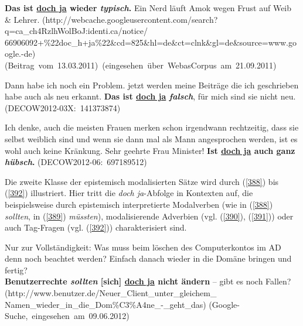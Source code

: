 \begin{exe}
	\ex\label{385}
	\scriptsize
	 \textbf{Das ist \underline{doch ja} wieder \textit{typisch}.} Ein \glqq Nerd\grqq{} läuft Amok wegen Frust auf Weib \&
 		Lehrer.
 	\newline
	\hbox{}\hfill\hbox{(http://webcache.googleusercontent.com/search?q=ca\_ch4Rz\\lhWolBoJ:identi.ca/notice/}
	\newline
	\hbox{}\hfill\hbox{66906092+\%22doc\_h+ja\%22\&cd=825\&hl=de\&ct=clnk\&gl=de\&source=www.google.-de)}
	\newline
	\hbox{}\hfill\hbox{(Beitrag vom 13.03.2011) (eingesehen über WebasCorpus am 21.09.2011)}						
	\newline
	\hbox{}\hfill\hbox{\citet[176]{Mueller2014a}}	 
\end{exe}

\begin{exe}
	\ex\label{386}
	\scriptsize
	Dann habe ich noch ein Problem. jetzt werden meine Beiträge die ich geschrieben habe auch als neu erkannt. \textbf{Das ist \underline{doch ja} 				\textit{falsch}}, für mich sind sie nicht neu. 
	\hfill\hbox{(DECOW2012-03X: 141373874)}	 
\end{exe}

\begin{exe}
	\ex\label{387}
	\scriptsize
	Ich denke, auch die meisten Frauen merken schon irgendwann rechtzeitig, dass sie selbst weiblich sind und wenn sie dann mal als Mann angesprochen 			werden, ist es wohl auch keine Kränkung. \glqq Sehr geehrte Frau Minister!\grqq{} \textbf{Ist \underline{doch ja} auch ganz \textit{hübsch}.} 
	\hfill\hbox{(DECOW2012-06: 697189512)}	 
	\newline
	\hbox{}\hfill\hbox{\citet[201]{Mueller2014a}}	
\end{exe}
Die zweite Klasse der epistemisch modalisierten Sätze wird durch (\ref{388}) bis (\ref{392}) illustriert. Hier tritt die \textit{doch ja}-Abfolge in Kontexten auf, die beispielsweise durch  epistemisch interpretierte Modalverben (wie in (\ref{388}) \textit{sollten}, in (\ref{389}) \textit{müssten}),  modalisierende Adverbien (vgl. (\ref{390}), (\ref{391})) oder  auch Tag-Fragen (vgl. (\ref{392})) charakterisiert sind.
													         	     
\begin{exe}
	\ex\label{388}
	\scriptsize
	Nur zur Vollständigkeit: Was muss beim löschen des Computerkontos im AD denn noch beachtet werden? Einfach danach wieder in die Domäne bringen und 			fertig?\\
	\textbf{Benutzerrechte \textit{sollten} [sich] \underline{doch ja} nicht ändern} – gibt es noch Fallen? 
	\newline
	\hbox{}\hfill\hbox{(http://www.benutzer.de/Neuer\_Client\_unter\_gleichem\_}	
	\newline
	\hbox{}\hfill\hbox{Namen\_wieder\_in\_die\_Dom\%C3\%A4ne\_-\_geht\_das)}	
	\newline
	\hbox{}\hfill\hbox{(Google-Suche, eingesehen am 09.06.2012)}
\end{exe}																   	

